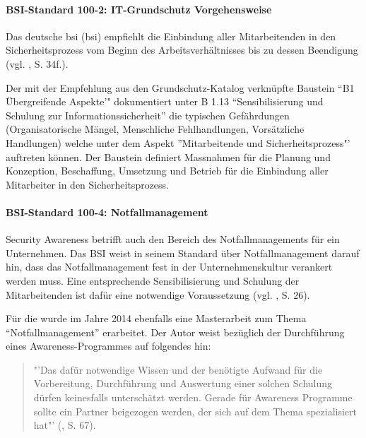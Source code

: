 \documentclass[../../main.tex]{subfiles}
\begin{document}
\paragraph*{BSI-Standard 100-2: IT-Grundschutz Vorgehensweise}\mbox{}

\begin{sloppypar}
Das deutsche \acrlong{bsi} (\acrshort{bsi}) empfiehlt die Einbindung aller Mitarbeitenden in den Sicherheitsprozess vom Beginn des Arbeitsverhältnisses bis zu dessen Beendigung (vgl. \cite{bsi_bsi-standard_2008}, S. 34f.).

Der mit der Empfehlung aus den Grundschutz-Katalog verknüpfte Baustein "`B1 Übergreifende Aspekte'" dokumentiert unter B 1.13 "`Sensibilisierung und Schulung zur Informationssicherheit"' die typischen Gefährdungen (Organisatorische Mängel, Menschliche Fehlhandlungen, Vorsätzliche Handlungen) welche unter dem Aspekt "'Mitarbeitende und Sicherheitsprozess"' auftreten können. Der Baustein  definiert Massnahmen für die Planung und Konzeption, Beschaffung, Umsetzung und Betrieb für die Einbindung aller Mitarbeiter in den Sicherheitsprozess.
\end{sloppypar}

\paragraph*{BSI-Standard 100-4: Notfallmanagement}\mbox{}

\begin{sloppypar}
Security Awareness betrifft auch den Bereich des Notfallmanagements für ein Unternehmen. Das BSI weist in seinem Standard über Notfallmanagement darauf hin, dass das Notfallmanagement fest in der Unternehmenskultur verankert werden muss. Eine entsprechende Sensibilisierung und Schulung der Mitarbeitenden ist dafür eine notwendige Voraussetzung (vgl. \cite{bsi_bsi-standard_2008-1}, S. 26).

Für die \companyshort{} wurde im Jahre 2014 ebenfalls eine Masterarbeit zum Thema "`Notfallmanagement"' erarbeitet. Der Autor weist bezüglich der Durchführung eines Awareness-Programmes auf folgendes hin:

\begin{quote}
"'Das dafür notwendige Wissen und der benötigte Aufwand für die Vorbereitung, Durchführung und Auswertung einer solchen Schulung dürfen keinesfalls unterschätzt werden. Gerade für Awareness Programme sollte ein Partner beigezogen werden, der sich auf dem Thema spezialisiert hat"' (\cite{schultheiss_business_2015}, S. 67).
\end{quote}

\end{sloppypar}
\end{document}
